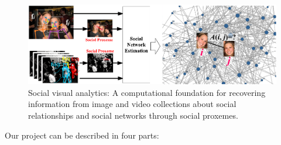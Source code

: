 \begin{figure}[t!]
\begin{center}
\includegraphics[width=\columnwidth]{intro_2014}
\end{center}
\vspace{-0.25in} \caption{\captionsize 
Social visual analytics: A computational foundation for recovering information from image and video collections about social relationships and social networks through social proxemes. \label{fig:intro}\afterfigspace}
\end{figure}

Our project can be described in four parts:

